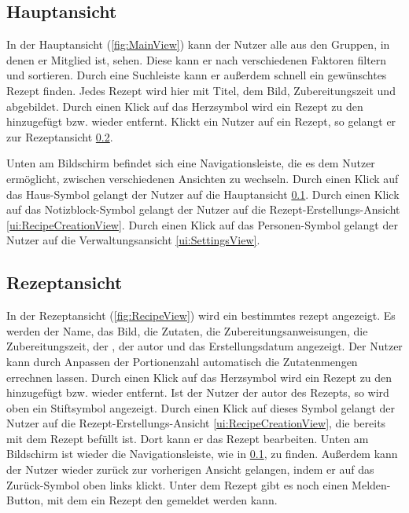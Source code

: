 \documentclass[parskip=full]{scrartcl}
\begin{document}
\subsection{Hauptansicht}
\label{ui:MainView}
In der Hauptansicht (\autoref{fig:MainView}) kann der Nutzer alle  aus den Gruppen, in denen er Mitglied ist, sehen. Diese kann er nach verschiedenen Faktoren filtern und sortieren. Durch eine Suchleiste kann er außerdem schnell ein gewünschtes Rezept finden. Jedes Rezept wird hier mit Titel, dem Bild, Zubereitungszeit und  abgebildet. Durch einen Klick auf das Herzsymbol wird ein Rezept zu den  hinzugefügt bzw. wieder entfernt. Klickt ein Nutzer auf ein Rezept, so gelangt er zur Rezeptansicht \ref{ui:RecipeView}.

Unten am Bildschirm befindet sich eine Navigationsleiste, die es dem Nutzer ermöglicht, zwischen verschiedenen Ansichten zu wechseln. Durch einen Klick auf das Haus-Symbol gelangt der Nutzer auf die Hauptansicht \ref{ui:MainView}. Durch einen Klick auf das Notizblock-Symbol gelangt der Nutzer auf die Rezept-Erstellungs-Ansicht \ref{ui:RecipeCreationView}. Durch einen Klick auf das Personen-Symbol gelangt der Nutzer auf die Verwaltungsansicht \ref{ui:SettingsView}.

\subsection{Rezeptansicht}
\label{ui:RecipeView}

In der Rezeptansicht (\autoref{fig:RecipeView}) wird ein bestimmtes \gls{rezept} angezeigt. Es werden der Name, das Bild, die Zutaten, die Zubereitungsanweisungen, die Zubereitungszeit, der , der \gls{autor} und das Erstellungsdatum angezeigt. Der Nutzer kann durch Anpassen der Portionenzahl automatisch die Zutatenmengen errechnen lassen. Durch einen Klick auf das Herzsymbol wird ein Rezept zu den  hinzugefügt bzw. wieder entfernt. Ist der Nutzer der \gls{autor} des Rezepts, so wird oben ein Stiftsymbol angezeigt. Durch einen Klick auf dieses Symbol gelangt der Nutzer auf die Rezept-Erstellungs-Ansicht \ref{ui:RecipeCreationView}, die bereits mit dem Rezept befüllt ist. Dort kann er das Rezept bearbeiten. Unten am Bildschirm ist wieder die Navigationsleiste, wie in \ref{ui:MainView}, zu finden. Außerdem kann der Nutzer wieder zurück zur vorherigen Ansicht gelangen, indem er auf das Zurück-Symbol oben links klickt. Unter dem Rezept gibt es noch einen Melden-Button, mit dem ein Rezept den  gemeldet werden kann.
\end{document}

